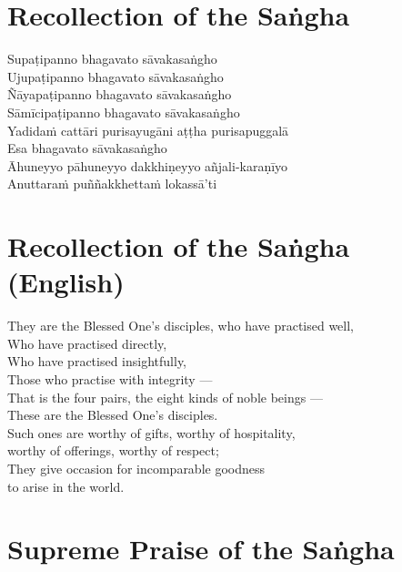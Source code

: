 \section*{Recollection of the Saṅgha}

\begin{leader}
\end{leader}

Supaṭipanno bhagavato sāvakasaṅgho\\
Ujupaṭipanno bhagavato sāvakasaṅgho\\
Ñāyapaṭipanno bhagavato sāvakasaṅgho\\
Sāmīcipaṭipanno bhagavato sāvakasaṅgho\\
Yadidaṁ cattāri purisayugāni aṭṭha purisapuggalā\\
Esa bhagavato sāvakasaṅgho\\
Āhuneyyo pāhuneyyo dakkhiṇeyyo añjali-karaṇīyo\\
Anuttaraṁ puññakkhettaṁ lokassā'ti

\section*{Recollection of the Saṅgha (English)}

\begin{leader}
\end{leader}

They are the Blessed One's disciples, who have practised well,\\
Who have practised directly,\\
Who have practised insightfully,\\
Those who practise with integrity ---\\
That is the four pairs, the eight kinds of noble beings ---\\
These are the Blessed One's disciples.\\
Such ones are worthy of gifts, worthy of hospitality,\\
\vin worthy of offerings, worthy of respect;\\
They give occasion for incomparable goodness\\\vin to arise in the world.

\section*{Supreme Praise of the Saṅgha}

